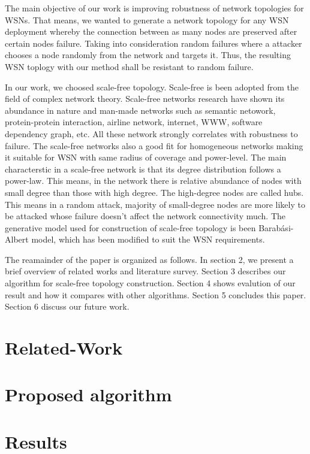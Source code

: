 \documentclass{article}
\begin{document}
The main objective of our work is improving robustness of network topologies for WSNs. That means, we wanted to generate a network topology for any WSN deployment whereby the connection between as many nodes are preserved after certain nodes failure. Taking into consideration random failures where a attacker chooses a node randomly from the network and targets it. Thus, the resulting WSN toplogy with our method shall be resistant to random failure.

In our work, we choosed scale-free topology. Scale-free is been adopted from the field of complex network theory. Scale-free networks research have shown its abundance in nature and man-made networks such as semantic netowork, protein-protein interaction, airline network, internet, WWW, software dependency graph, etc. All these network strongly correlates with robustness to failure. The scale-free networks also a good fit for homogeneous networks making it suitable for WSN with same radius of coverage and power-level. The main characterstic in a scale-free network is that its degree distribution follows a power-law. This means, in the network there is relative abundance of nodes with small degree than those with high degree. The high-degree nodes are called hubs. This means in a random attack, majority of small-degree nodes are more likely to be attacked whose failure doesn't affect the network connectivity much. The generative model used for construction of scale-free topology is been Barab{\'a}si-Albert model, which has been modified to suit the WSN requirements. 

The reamainder of the paper is organized as follows. In section 2, we present a brief overview of related works and literature survey. Section 3 describes our algorithm for scale-free topology construction. Section 4 shows evalution of our result and how it compares with other algorithms. Section 5 concludes this paper. Section 6 discuss our future work.

\section{Related-Work}


\section{Proposed algorithm}

\section{Results}
\end{document}
